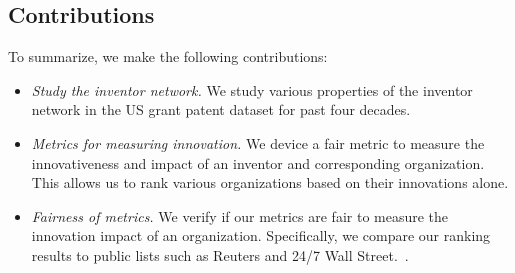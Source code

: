 \subsection{Contributions}

To summarize, we make the following contributions:

	\begin{itemize} 
		\item {\em Study the inventor network.} We study various properties of the inventor network in the US grant patent dataset for past four decades.  
		\item {\em Metrics for measuring innovation.} We device a fair metric to measure the innovativeness and impact of an inventor and corresponding organization. This allows us to rank various organizations based on their innovations alone. 
		\item {\em Fairness of metrics.} We verify if our metrics are fair to measure the innovation impact of an organization. Specifically, we compare our ranking results to public lists such as Reuters and 24/7 Wall Street.~\cite{top100, 247wallst}.
	\end{itemize}